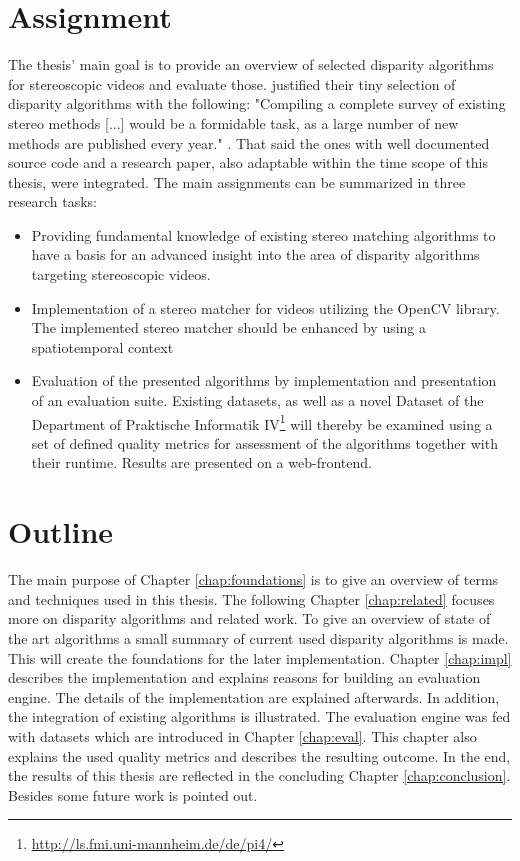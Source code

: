 \section{Assignment}

The thesis' main goal is to provide an overview of selected disparity algorithms for stereoscopic videos and evaluate those.
\citeauthor{scharstein2002taxonomy} justified their tiny selection of disparity algorithms with the following: "Compiling a complete survey of existing stereo methods [...] would be a formidable task, as a large number of new methods are published every year." \citep{scharstein2002taxonomy}.
That said the ones with well documented source code and a research paper, also adaptable within the time scope of this thesis, were integrated.
The main assignments can be summarized in three research tasks:

\begin{itemize}
  \item Providing fundamental knowledge of existing stereo matching algorithms to have a basis for an advanced insight into the area of disparity algorithms targeting stereoscopic videos.
  \item Implementation of a stereo matcher for videos utilizing the OpenCV library. The implemented stereo matcher should be enhanced by using a spatiotemporal context
  \item Evaluation of the presented algorithms by implementation and presentation of an evaluation suite. Existing datasets, as well as a novel Dataset of the Department of Praktische Informatik IV\footnote{\url{http://ls.fmi.uni-mannheim.de/de/pi4/}} will thereby be examined using a set of defined quality metrics for assessment of the algorithms together with their runtime. Results are presented on a web-frontend.
\end{itemize}

\section{Outline}

The main purpose of Chapter \ref{chap:foundations} is to give an overview of terms and techniques used in this thesis.
The following Chapter \ref{chap:related} focuses more on disparity algorithms and related work.
To give an overview of state of the art algorithms a small summary of current used disparity algorithms is made.
This will create the foundations for the later implementation.
Chapter \ref{chap:impl} describes the implementation and explains reasons for building an evaluation engine.
The details of the implementation are explained afterwards.
In addition, the integration of existing algorithms is illustrated.
The evaluation engine was fed with datasets which are introduced in Chapter \ref{chap:eval}.
This chapter also explains the used quality metrics and describes the resulting outcome.
In the end, the results of this thesis are reflected in the concluding Chapter \ref{chap:conclusion}.
Besides some future work is pointed out.
